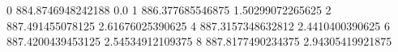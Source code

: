 0 884.8746948242188 0.0
1 886.377685546875 1.50299072265625
2 887.491455078125 2.61676025390625
4 887.3157348632812 2.4410400390625
6 887.4200439453125 2.54534912109375
8 887.8177490234375 2.94305419921875

